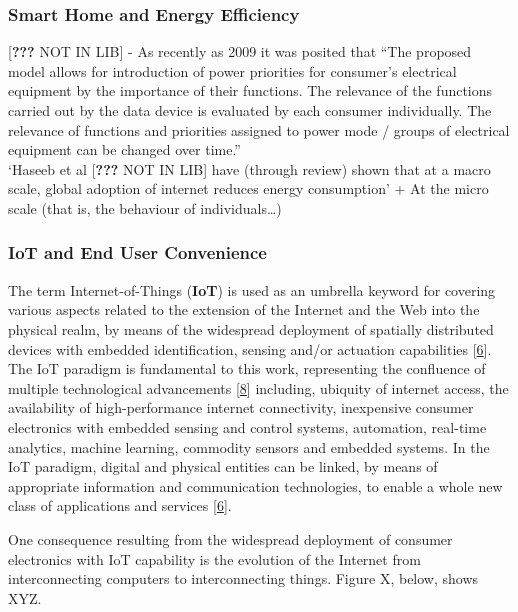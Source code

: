 \documentclass[11pt,]{article}
\begin{document}
\hypertarget{smart-home-and-energy-efficiency}{%
\subsubsection{Smart Home and Energy
Efficiency}\label{smart-home-and-energy-efficiency}}

{[}{\textbf{???}} NOT IN LIB{]} - As recently as 2009 it was posited
that ``The proposed model allows for introduction of power priorities
for consumer's electrical equipment by the importance of their
functions. The relevance of the functions carried out by the data device
is evaluated by each consumer individually. The relevance of functions
and priorities assigned to power mode / groups of electrical equipment
can be changed over time.''\\
`Haseeb et al {[}{\textbf{???}} NOT IN LIB{]} have (through review)
shown that at a macro scale, global adoption of internet reduces energy
consumption' + At the micro scale (that is, the behaviour of
individuals\ldots)

\hypertarget{iot-and-end-user-convenience}{%
\subsubsection{IoT and End User
Convenience}\label{iot-and-end-user-convenience}}

The term Internet-of-Things (\textbf{IoT}) is used as an umbrella
keyword for covering various aspects related to the extension of the
Internet and the Web into the physical realm, by means of the widespread
deployment of spatially distributed devices with embedded
identification, sensing and/or actuation capabilities
{[}\protect\hyperlink{ref-danielemiorandiInternetThingsVision2012}{6}{]}.
The IoT paradigm is fundamental to this work, representing the
confluence of multiple technological advancements
{[}\protect\hyperlink{ref-luigiatzoriInternetThingsSurvey2010}{8}{]}
including, ubiquity of internet access, the availability of
high-performance internet connectivity, inexpensive consumer electronics
with embedded sensing and control systems, automation, real-time
analytics, machine learning, commodity sensors and embedded systems. In
the IoT paradigm, digital and physical entities can be linked, by means
of appropriate information and communication technologies, to enable a
whole new class of applications and services
{[}\protect\hyperlink{ref-danielemiorandiInternetThingsVision2012}{6}{]}.

One consequence resulting from the widespread deployment of consumer
electronics with IoT capability is the evolution of the Internet from
interconnecting computers to interconnecting things. Figure X, below,
shows XYZ.
\end{document}
